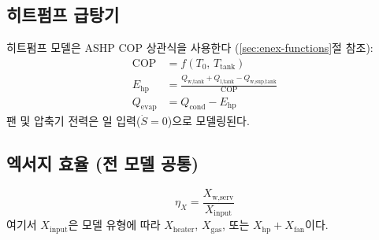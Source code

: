 \subsection{히트펌프 급탕기}

히트펌프 모델은 ASHP COP 상관식을 사용한다 (\ref{sec:enex-functions}절 참조):
\begin{align}
  \text{COP} &= f(T_0,\,T_\text{tank}) \label{eq:hpb-COP}\\
  E_\text{hp} &= \frac{Q_\text{w,tank} + Q_\text{l,tank} - Q_\text{w,sup,tank}}{\text{COP}} \label{eq:hpb-Ehp}\\
  Q_\text{evap} &= Q_\text{cond} - E_\text{hp} \label{eq:hpb-Qevap}
\end{align}
팬 및 압축기 전력은 일 입력($\dot{S} = 0$)으로 모델링된다.

\subsection{엑서지 효율 (전 모델 공통)}

\begin{equation}\label{eq:dhw-Xeff}
  \eta_X = \frac{X_\text{w,serv}}{X_\text{input}}
\end{equation}
여기서 $X_\text{input}$은 모델 유형에 따라 $X_\text{heater}$, $X_\text{gas}$, 또는 $X_\text{hp} + X_\text{fan}$이다.
